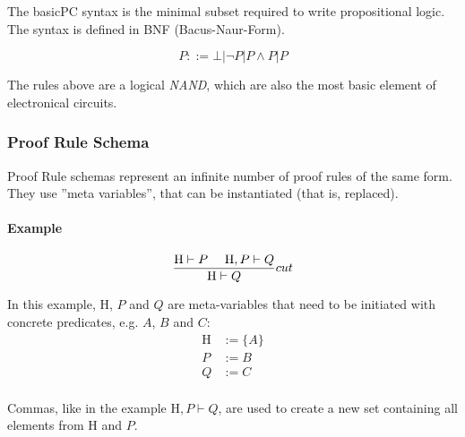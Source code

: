 The basicPC syntax is the minimal subset required to write propositional logic. The syntax is defined in BNF (Bacus-Naur-Form).

\[
	P ::= \bot | \neg P | P \land P | P
\]

The rules above are a logical \emph{NAND}, which are also the most basic element of electronical circuits.

\subsubsection{Proof Rule Schema}

Proof Rule schemas represent an infinite number of proof rules of the same form. They use ''meta variables'', that can be instantiated (that is, replaced).

\paragraph{Example} 
\[
	\frac{
		\text{H} \vdash P \text{ }\text{ }\text{ }\text{ } \text{H}, P \vdash Q
	 }{
		\text{H} \vdash Q
	} cut
\]

In this example, H, $P$ and $Q$ are meta-variables that need to be initiated with concrete predicates, e.g. $A$, $B$ and $C$: \begin{align*}
  \text{H} &:= \{A\} \\
	P &:= B \\
	Q &:= C \\
\end{align*}

Commas, like in the example $\text{H}, P \vdash Q$, are used to create a new set containing all elements from H and $P$.

